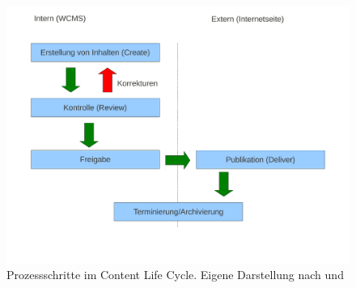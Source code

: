 \begin{figure}[!ht]
\begin{center}
\includegraphics[scale=0.5]{images/grundlagen/lifecycle.pdf}
\caption[Prozessschritte im Content Life Cycle]{Prozessschritte im Content Life Cycle. Eigene Darstellung nach \citep[S. 81]{rockley} und \citep[S. 10]{RitterSwot}}
\label{lifecylcepic}
\end{center}
\end{figure}


